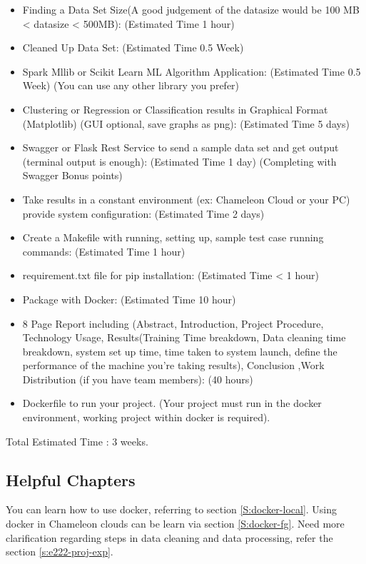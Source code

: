 \begin{itemize}
\item Finding a Data Set Size(A good judgement of the datasize would
  be 100 MB < datasize < 500MB): (Estimated Time 1 hour)
\item Cleaned Up Data Set: (Estimated Time 0.5 Week)
\item Spark Mllib or Scikit Learn ML Algorithm Application: (Estimated
  Time 0.5 Week) (You can use any other library you prefer)
\item Clustering or Regression or Classification results in Graphical
  Format (Matplotlib) (GUI optional, save graphs as png): (Estimated
  Time 5 days)
\item Swagger or Flask  Rest Service  to send  a sample data  set and  get output
  (terminal output is enough): (Estimated Time 1 day) (Completing with Swagger Bonus points)
\item Take results in a constant environment (ex: Chameleon Cloud or
  your PC) provide system configuration: (Estimated Time 2 days)
\item Create a Makefile with running, setting up, sample test case
  running commands: (Estimated Time 1 hour)
\item requirement.txt file for pip installation: (Estimated Time < 1 hour)
\item Package with Docker: (Estimated Time 10 hour)
\item 8 Page Report including (Abstract, Introduction, Project
  Procedure, Technology Usage, Results(Training Time breakdown, Data
  cleaning time breakdown, system set up time, time taken to system
  launch, define the performance of the machine you're taking
  results), Conclusion ,Work Distribution (if you have team members): (40 hours)
\item Dockerfile to run your project. (Your project must run in the
  docker environment, working project within docker is required).
\end{itemize}

Total Estimated Time : 3 weeks.

\subsection{Helpful Chapters}

You can learn how to use docker, referring to section
\ref{S:docker-local}.  Using docker in Chameleon clouds can be learn
via section \ref{S:docker-fg}.  Need more clarification regarding
steps in data cleaning and data processing, refer the section
\ref{s:e222-proj-exp}.



